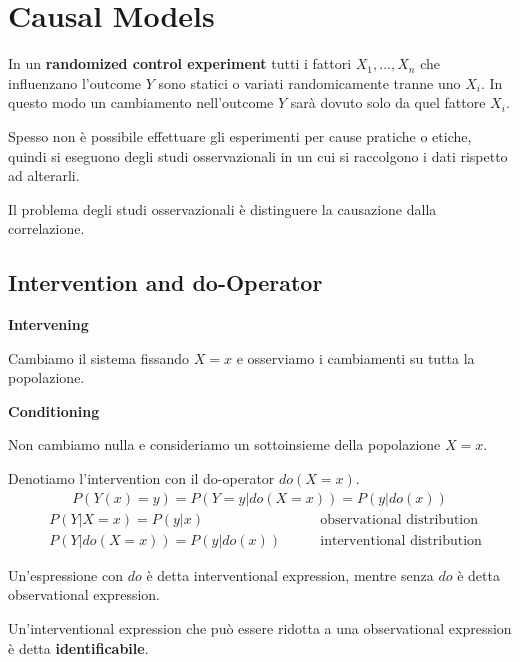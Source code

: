 \chapter{Causal Models}
In un \textbf{randomized control experiment} tutti i fattori $X_1, ..., X_n$ che influenzano l'outcome $Y$ sono statici o variati randomicamente tranne uno  $X_i$.
In questo modo un cambiamento nell'outcome $Y$ sarà dovuto solo da quel fattore $X_i$.

Spesso non è possibile effettuare gli esperimenti per cause pratiche o etiche, quindi si eseguono degli studi osservazionali in un cui
si raccolgono i dati rispetto ad alterarli.

Il problema degli studi osservazionali è distinguere la causazione dalla correlazione.

\section{Intervention and do-Operator}
\begin{center}
  \begin{minipage}{0.475\linewidth}
    \centering
    \textbf{Intervening}

    Cambiamo il sistema fissando $X=x$ e osserviamo i cambiamenti su tutta la popolazione.
  \end{minipage}
  \begin{minipage}{0.475\linewidth}
    \centering
    \textbf{Conditioning}

    Non cambiamo nulla e consideriamo un sottoinsieme della popolazione $X=x$.
  \end{minipage}
\end{center}

Denotiamo l'intervention con il do-operator $do(X=x)$.
\begin{align*}
  P(Y(x) = y) = P(Y = y | do(X = x)) = P(y | do(x))
\end{align*}
%
\begin{align*}
   & P(Y | X = x) = P(y | x)         \qquad & \text{observational distribution}  \\
   & P(Y | do(X = x)) = P(y | do(x)) \qquad & \text{interventional distribution}
\end{align*}

Un'espressione con $do$ è detta interventional expression, mentre senza $do$ è detta observational expression.

Un'interventional expression che può essere ridotta a una observational expression è detta \textbf{identificabile}.

